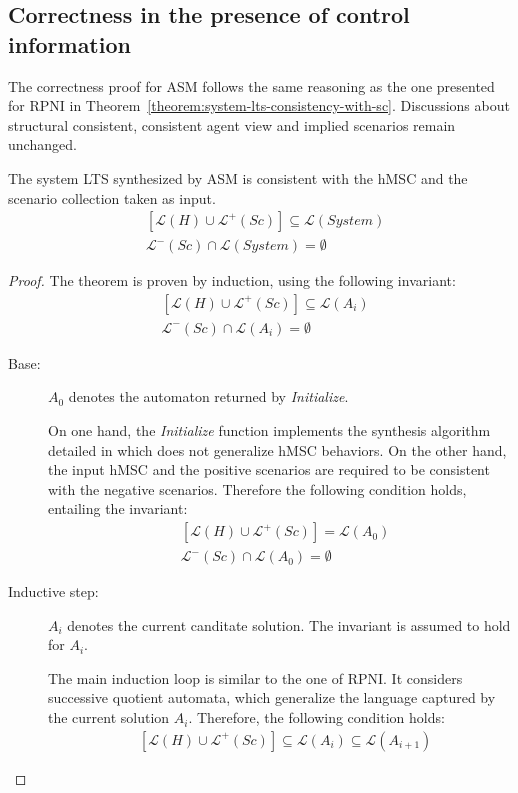 
\subsection{Correctness in the presence of control information\label{subsection:correctness-of-asm}}

The correctness proof for ASM follows the same reasoning as the one presented for RPNI in Theorem~\ref{theorem:system-lts-consistency-with-sc}. Discussions about structural consistent, consistent agent view and implied scenarios remain unchanged. 

\begin{theorem}
The system LTS synthesized by ASM is consistent with the hMSC and the scenario collection taken as input.
\begin{align*}
&[\mathcal{L}(H)   \cup \mathcal{L}^+(Sc)] \subseteq \mathcal{L}(System)\\
&\mathcal{L}^-(Sc) \cap \mathcal{L}(System) = \emptyset
\end{align*}
\begin{proof}
The theorem is proven by induction, using the following invariant:
\begin{align*}
&[\mathcal{L}(H) \cup \mathcal{L}^+(Sc)] \subseteq \mathcal{L}(A_i)\\
&\mathcal{L}^-(Sc) \cap \mathcal{L}(A_i) = \emptyset
\end{align*}

\begin{description}
\item[Base:] $A_0$ denotes the automaton returned by \emph{Initialize}.

On one hand, the \emph{Initialize} function implements the synthesis algorithm detailed in \cite{Uchitel:2003} which does not generalize hMSC behaviors. On the other hand, the input hMSC and the positive scenarios are required to be consistent with the negative scenarios. Therefore the following condition holds, entailing the invariant:
\begin{align*}
&[\mathcal{L}(H) \cup \mathcal{L}^+(Sc)] = \mathcal{L}(A_0)\\
&\mathcal{L}^-(Sc) \cap \mathcal{L}(A_0) = \emptyset
\end{align*}

\item[Inductive step:] $A_i$ denotes the current canditate solution. The invariant is assumed to hold for $A_i$.

The main induction loop is similar to the one of RPNI. It considers successive quotient automata, which generalize the language captured by the current solution $A_i$. Therefore, the following condition holds:
\begin{align*}
&[\mathcal{L}(H) \cup \mathcal{L}^+(Sc)] \subseteq \mathcal{L}(A_i) \subseteq \mathcal{L}(A_{i+1})
\end{align*}


\end{description}
\end{proof}
\end{theorem}
